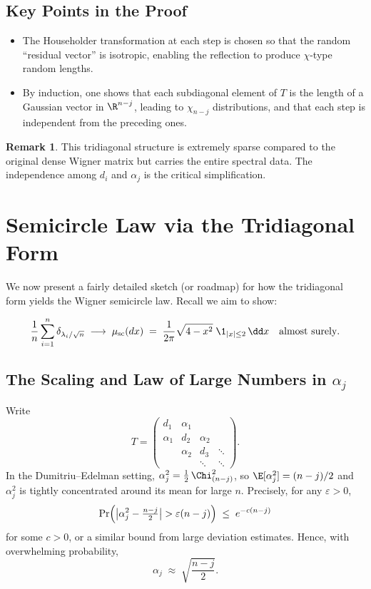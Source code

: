 \documentclass[letterpaper,11pt,oneside,reqno]{article}
\numberwithin{equation}{section}
\theoremstyle{definition}
\newtheorem{remark}[proposition]{Remark}
\begin{document}
\subsection{Key Points in the Proof}

\begin{itemize}
\item The Householder transformation at each step is chosen so that the random “residual vector” is isotropic, enabling the reflection to produce $\chi$-type random lengths.
\item By induction, one shows that each subdiagonal element of $T$ is the length of a Gaussian vector in $\R^{n-j}$, leading to $\chi_{n-j}$ distributions, and that each step is independent from the preceding ones.
\end{itemize}

\begin{remark}
This tridiagonal structure is extremely sparse compared to the original dense Wigner matrix but carries the entire spectral data. The independence among $d_i$ and $\alpha_j$ is the critical simplification.
\end{remark}

\section{Semicircle Law via the Tridiagonal Form}
\label{sec:semicircle-tridiag}

We now present a fairly detailed sketch (or roadmap) for how the tridiagonal form yields the Wigner semicircle law. Recall we aim to show:

\[
  \frac{1}{n}\sum_{i=1}^n \delta_{\lambda_i/\sqrt{n}}
  \;\longrightarrow\;
  \mu_{\mathrm{sc}}(dx)\;=\;\frac{1}{2\pi}\sqrt{4 - x^2}\;\1_{|x|\le2}\,\dd x
  \quad\text{almost surely}.
\]

\subsection{The Scaling and Law of Large Numbers in \(\alpha_j\)}

Write
\[
  T = \begin{pmatrix}
    d_1 & \alpha_1 & & \\
    \alpha_1 & d_2 & \alpha_2 & \\
    & \alpha_2 & d_3 & \ddots \\
    & & \ddots & \ddots
  \end{pmatrix}.
\]
In the Dumitriu--Edelman setting, $\alpha_j^2 = \frac{1}{2}\,\Chi^2_{(n-j)}$, so $\E[\alpha_j^2]=(n-j)/2$ and $\alpha_j^2$ is tightly concentrated around its mean for large $n$. Precisely, for any $\varepsilon>0$,
\[
  \Pr\Bigl(\bigl|\alpha_j^2 - \tfrac{n-j}{2}\bigr| > \varepsilon (n-j)\Bigr)
  \;\le\; e^{-c(n-j)}
\]
for some $c>0$, or a similar bound from large deviation estimates. Hence, with overwhelming probability,
\[
  \alpha_j \;\approx\; \sqrt{\frac{n-j}{2}}.
\]
\end{document}
